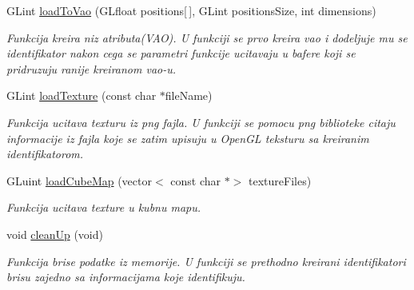 \begin{DoxyCompactItemize}
G\+Lint \hyperlink{classcore_1_1VaoLoader_aebc9e5741cb2458b06859aad21621e08}{load\+To\+Vao} (G\+Lfloat positions\mbox{[}$\,$\mbox{]}, G\+Lint positions\+Size, int dimensions)
\begin{DoxyCompactList}\small\item\em Funkcija kreira niz atributa(\+V\+A\+O). U funkciji se prvo kreira vao i dodeljuje mu se identifikator nakon cega se parametri funkcije ucitavaju u bafere koji se pridruzuju ranije kreiranom vao-\/u. \end{DoxyCompactList}\item 
G\+Lint \hyperlink{classcore_1_1VaoLoader_aeefd4de3346c1036d8d7249694fd404d}{load\+Texture} (const char $\ast$file\+Name)
\begin{DoxyCompactList}\small\item\em Funkcija ucitava texturu iz png fajla. U funkciji se pomocu png biblioteke citaju informacije iz fajla koje se zatim upisuju u Open\+GL teksturu sa kreiranim identifikatorom. \end{DoxyCompactList}\item 
G\+Luint \hyperlink{classcore_1_1VaoLoader_a98165161bee2940808fe5e546dfa25d9}{load\+Cube\+Map} (vector$<$ const char $\ast$$>$ texture\+Files)
\begin{DoxyCompactList}\small\item\em Funkcija ucitava texture u kubnu mapu. \end{DoxyCompactList}\item 
void \hyperlink{classcore_1_1VaoLoader_a15a5ec23ffe560ad7117980aaf0d97b9}{clean\+Up} (void)
\begin{DoxyCompactList}\small\item\em Funkcija brise podatke iz memorije. U funkciji se prethodno kreirani identifikatori brisu zajedno sa informacijama koje identifikuju. \end{DoxyCompactList}\end{DoxyCompactItemize}
